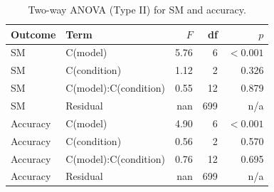 \begin{table}[H]
\caption{Two-way ANOVA (Type II) for SM and accuracy.}
\label{tab:twoway:anova}
\centering
\begin{tabular}{llrrr}
\toprule
Outcome & Term & $F$ & df & $p$ \\
\midrule
SM & C(model) & 5.76 & 6 & $<0.001$ \\
SM & C(condition) & 1.12 & 2 & 0.326 \\
SM & C(model):C(condition) & 0.55 & 12 & 0.879 \\
SM & Residual & nan & 699 & n/a \\
Accuracy & C(model) & 4.90 & 6 & $<0.001$ \\
Accuracy & C(condition) & 0.56 & 2 & 0.570 \\
Accuracy & C(model):C(condition) & 0.76 & 12 & 0.695 \\
Accuracy & Residual & nan & 699 & n/a \\
\bottomrule
\end{tabular}
\end{table}

